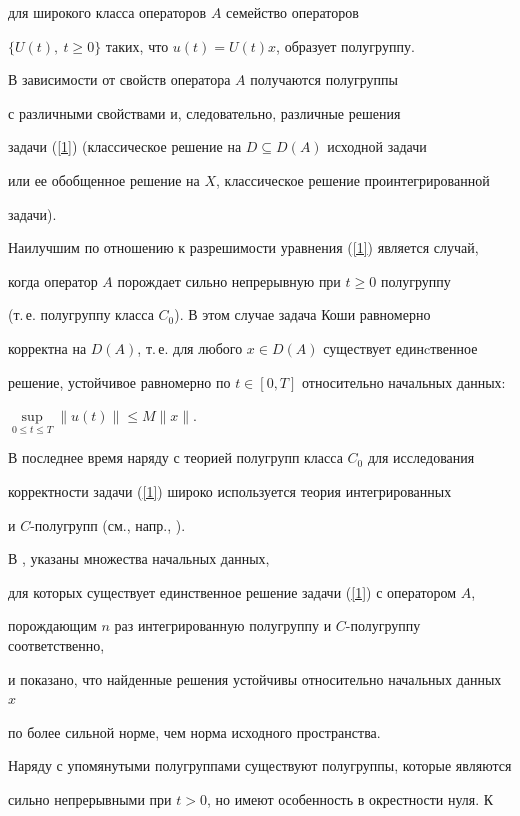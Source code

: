 для широкого класса операторов $A$ семейство операторов 


$\{U(t),\ t\geq 0\}$ таких, что $u(t)=U(t)x$, образует полугруппу.


В зависимости от свойств оператора $A$ получаются полугруппы


с различными свойствами и, следовательно, различные решения 


задачи (\ref{1}) (классическое решение на $D\subseteq D(A)$ исходной задачи


или ее обобщенное решение на $X$, классическое решение проинтегрированной


задачи).


Наилучшим по отношению к разрешимости уравнения (\ref{1}) является случай,


когда оператор $A$ порождает сильно непрерывную при $t\geq 0$ полугруппу 


(т.\,е. полугруппу класса $C_0$). В этом случае задача Коши равномерно 


корректна на $D(A)$, т.\,е. для любого $x\in D(A)$ существует единcтвенное 


решение, устойчивое равномерно по $t\in[0,T]$ относительно начальных данных: 


$\sup\limits_{0\leq t\leq T}\|u(t)\|\leq M\|x\|$.





В последнее время наряду с теорией полугрупп класса $C_0$ для исследования


корректности задачи (\ref{1}) широко используется теория интегрированных 


и $C$-полугрупп (см., напр., \cite{Melnik}).


В \cite{Neubrander}, \cite{Tanaka1} указаны множества начальных данных,


для которых существует единственное решение задачи (\ref{1}) с оператором $A$,


порождающим $n$ раз интегрированную полугруппу и $C$-полугруппу соответственно,


и показано, что найденные решения устойчивы относительно начальных данных $x$


по более сильной норме, чем норма исходного пространства.





Наряду с упомянутыми полугруппами существуют полугруппы, которые являются 


сильно непрерывными при $t>0$, но имеют особенность в окрестности нуля. К 


